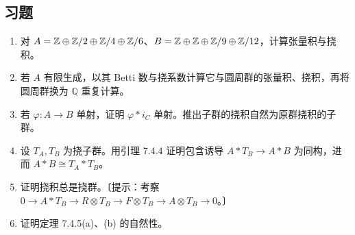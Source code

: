 \subsection*{习题}
\begin{enumerate}
\item 对 $A=\mathbb{Z}\oplus\mathbb{Z}/2\oplus\mathbb{Z}/4\oplus\mathbb{Z}/6$、$B=\mathbb{Z}\oplus\mathbb{Z}\oplus\mathbb{Z}/9\oplus\mathbb{Z}/12$，计算张量积与挠积。
\item 若 $A$ 有限生成，以其 Betti 数与挠系数计算它与圆周群的张量积、挠积，再将圆周群换为 $\mathbb Q$ 重复计算。
\item 若 $\varphi:A\to B$ 单射，证明 $\varphi*i_C$ 单射。推出子群的挠积自然为原群挠积的子群。
\item 设 $T_A,T_B$ 为挠子群。用引理 7.4.4 证明包含诱导 $A*T_B\to A*B$ 为同构，进而 $A*B\cong T_A*T_B$。
\item 证明挠积总是挠群。〔提示：考察 $0\to A*T_B\to R\otimes T_B\to F\otimes T_B\to A\otimes T_B\to0$。〕
\item 证明定理 7.4.5(a)、(b) 的自然性。
\end{enumerate}
